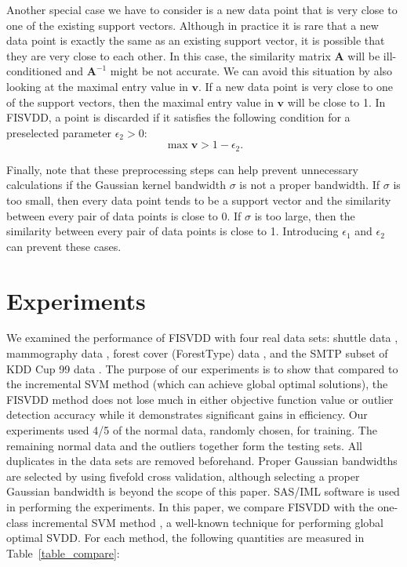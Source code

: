 \documentclass{article}
\newcommand{\tref}[1]{Table~\ref{#1}}
\numberwithin{equation}{section}
\begin{document}
Another special case we have to consider is a new data point that is very close to one of the existing support vectors. Although in practice it is rare that a new data point is exactly the same as an existing support vector, it is possible that they are very close to each other. In this case, the similarity matrix $\mathbf{A}$ will be ill-conditioned and $\mathbf{A}^{-1}$ might be not accurate. We can avoid this situation by also looking at the maximal entry value in $\mathbf{v}$. If a new data point is very close to one of the support vectors, then the maximal entry value in $\mathbf{v}$ will be close to 1. In FISVDD, a point is discarded if it satisfies the following condition for a preselected parameter $\epsilon_2>0$:
\begin{equation}\label{outlierdef}
\max{\mathbf{v}} > 1-\epsilon_2.
\end{equation}

Finally, note that these preprocessing steps can help prevent unnecessary calculations if the Gaussian kernel bandwidth $\sigma$ is not a proper bandwidth. If $\sigma$ is too small, then every data point tends to be a support vector and the similarity between every pair of data points is close to 0. If $\sigma$ is too large, then the similarity between every pair of data points is close to 1. Introducing $\epsilon_1$ and $\epsilon_2$ can prevent these cases.






\section{Experiments}\label{experiments}
We examined the performance of FISVDD with four real data sets: shuttle data \citep{Lichman:2013}, mammography data \citep{woods1993comparative}, forest cover (ForestType) data \citep{Rayana:2016}, and the SMTP subset of KDD Cup 99 data \citep{Rayana:2016}. The purpose of our experiments is to show that compared to the incremental SVM method (which can achieve global optimal solutions), the FISVDD method does not lose much in either objective function value or outlier detection accuracy while it demonstrates significant gains in efficiency. Our experiments used 4/5 of the normal data, randomly chosen, for training. The remaining normal data and the outliers together form the testing sets. All duplicates in the data sets are removed beforehand. Proper Gaussian bandwidths are selected by using fivefold cross validation, although selecting a proper Gaussian bandwidth is beyond the scope of this paper.  SAS/IML\textsuperscript{\tiny\textregistered} software is used in performing the experiments. In this paper, we compare FISVDD with the one-class incremental SVM method \citep{laskov2006incremental}, a well-known technique for performing global optimal SVDD. For each method, the following quantities are measured in \tref{table_compare}:
\end{document}

